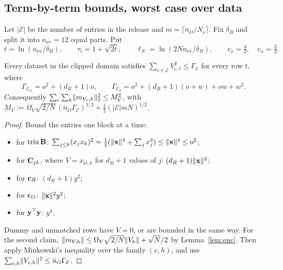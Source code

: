 \subsection{Term-by-term bounds, worst case over data}
\label{sec:bounds}

Let $|\mathcal E|$ be the number of entries in the release and $m=\lceil\bar n_O/N_s\rceil$. Fix $\delta_B$ and split it into $n_{\mathrm{ev}}=12$ equal parts. Put
\[
  t=\ln(n_{\mathrm{ev}}/\delta_B),\qquad \tau_t=1+\sqrt{2t},\qquad \ell_N=\ln(2Nn_{\mathrm{ev}}/\delta_B),\qquad v_s=\tfrac43,\quad v_u=\tfrac23 .
\]

\begin{lemma}\label{lem:data}
Every dataset in the clipped domain satisfies $\sum_{e\in\mathcal E}V_{e,t}^2\le\Gamma_{\mathcal E}$ for every row $t$, where
\[
  \Gamma_{\mathcal E_G}=o^2+(d_R+1)o,\qquad
  \Gamma_{\mathcal E_2}=o^2+(d_R+1)(o+w)+ow+w^2 .
\]
Consequently $\sum_e\sum_h\lVert m_{V_e,h}\rVert_2^2\le M_V^2$, with $M_V:=\Omega_V\sqrt{2/N}\,(\bar n_O\Gamma_{\mathcal E})^{1/2}+\tfrac12(|\mathcal E|mN)^{1/2}$.
\end{lemma}
\begin{proof}
Bound the entries one block at a time:
\begin{itemize}[nosep]
  \item for $\operatorname{triu}\mathbf{B}$: $\sum_{j\le k}(x_jx_k)^2=\tfrac12(\lVert \mathbf{x}\rVert^4+\sum_jx_j^4)\le\lVert \mathbf{x}\rVert^4\le o^2$;
  \item for $\mathbf{C}_{jk}$, where $V=x_{O,k}$ for $d_R+1$ values of $j$: $(d_R+1)\lVert \mathbf{x}\rVert^2$;
  \item for $\mathbf{c}_R$: $(d_R+1)y^2$;
  \item for $\mathbf{c}_O$: $\lVert \mathbf{x}\rVert^2y^2$;
  \item for $\mathbf{y}^\top\mathbf{y}$: $y^4$.
\end{itemize}
Dummy and unmatched rows have $V=0$, or are bounded in the same way. For the second claim, $\lVert m_{V,h}\rVert\le\Omega_V\sqrt{2/N}\lVert V_h\rVert+\sqrt N/2$ by Lemma~\ref{lem:enc}. Then apply Minkowski's inequality over the family $(e,h)$, and use $\sum_{e,h}\lVert V_{e,h}\rVert^2\le\bar n_O\Gamma_{\mathcal E}$.
\end{proof}

